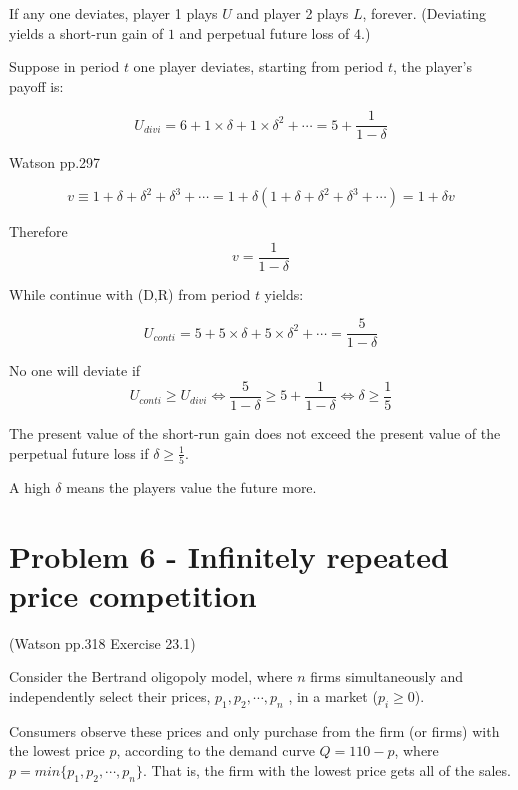 \documentclass{article}
\begin{document}
\medskip

If any one deviates, player 1 plays $U$ and player 2 plays $L$, forever.
(Deviating yields a short-run gain of $1$ and perpetual future loss of $4$.) 

\medskip

Suppose in period $t$ one player deviates, starting from period $t$, the player's payoff is:

$$U_{divi} = 6 + 1\times \delta + 1\times \delta^2 + \cdots = 5 + \frac{1}{1-\delta}$$

\begin{mdframed}[backgroundcolor=blue!20,linecolor=white]
Watson pp.297

$$v \equiv 1 + \delta + \delta^2 + \delta^3 + \cdots = 1 + \delta ( 1 + \delta +\delta^2 + \delta^3 + \cdots) = 1 + \delta v$$

Therefore $$v= \frac{1}{1-\delta}$$
\end{mdframed}

While continue with (D,R) from period $t$ yields:

$$U_{conti} = 5 + 5\times \delta + 5\times \delta^2 + \cdots = \frac{5}{1-\delta}$$

No one will deviate if $$U_{conti} \ge U_{divi} \iff \frac{5}{1-\delta} \ge 5 + \frac{1}{1-\delta} \iff  \delta \ge \frac{1}{5} $$

The present value of the short-run gain does not exceed the present value of the perpetual future loss if $\delta \geq \tfrac15$.

\begin{mdframed}[backgroundcolor=blue!20,linecolor=white]
A high $\delta$ means the players value the future more.
\end{mdframed}

\newpage

\section{Problem 6 - Infinitely repeated price competition}

(Watson pp.318 Exercise 23.1)


Consider the Bertrand oligopoly model, where $n$ firms simultaneously and independently
select their prices, $p_1 , p_2 , \cdots , p_n$ , in a market ($p_i \ge 0$). 

\smallskip

Consumers observe these prices and only purchase
from the firm (or firms) with the lowest price $p$, according to the demand
curve $Q = 110 - p$, where $p = min\{p_1 , p_2 , \cdots , p_n\}$. That is, the firm with the lowest price gets all of the sales. 
\end{document}
